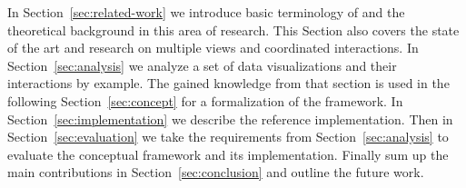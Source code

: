 In Section~\ref{sec:related-work} we introduce basic terminology of \cmvs{} and the theoretical background in this area of research.
This Section also covers the state of the art and research on multiple views and coordinated interactions.
In Section~\ref{sec:analysis} we analyze a set of data visualizations and their interactions by example.
The gained knowledge from that section is used in the following Section~\ref{sec:concept} for a formalization of the \cmv{} framework.
In Section~\ref{sec:implementation} we describe the reference implementation.
Then in Section~\ref{sec:evaluation} we take the requirements from Section~\ref{sec:analysis} to evaluate the conceptual framework and its implementation.
Finally sum up the main contributions in Section~\ref{sec:conclusion} and outline the future work.

